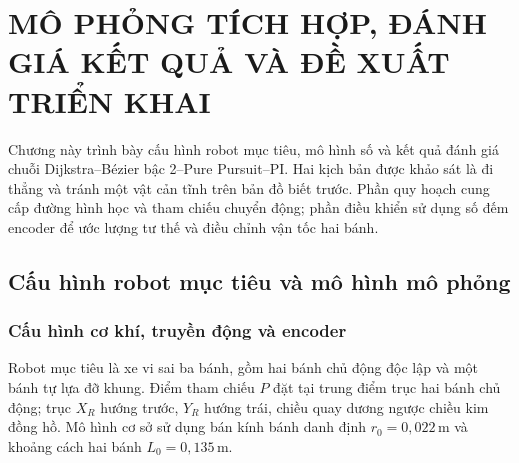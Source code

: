 \documentclass[12pt,a4paper,oneside]{report}
\begin{document}
\setcounter{chapter}{3}

\chapter{MÔ PHỎNG TÍCH HỢP, ĐÁNH GIÁ KẾT QUẢ VÀ ĐỀ XUẤT TRIỂN KHAI}
\label{chap:c4-doclap}

Chương này trình bày cấu hình robot mục tiêu, mô hình số và kết quả đánh giá chuỗi Dijkstra--Bézier bậc 2--Pure Pursuit--PI. Hai kịch bản được khảo sát là đi thẳng và tránh một vật cản tĩnh trên bản đồ biết trước. Phần quy hoạch cung cấp đường hình học và tham chiếu chuyển động; phần điều khiển sử dụng số đếm encoder để ước lượng tư thế và điều chỉnh vận tốc hai bánh.

\section{Cấu hình robot mục tiêu và mô hình mô phỏng}

\subsection{Cấu hình cơ khí, truyền động và encoder}

Robot mục tiêu là xe vi sai ba bánh, gồm hai bánh chủ động độc lập và một bánh tự lựa đỡ khung. Điểm tham chiếu \(P\) đặt tại trung điểm trục hai bánh chủ động; trục \(X_R\) hướng trước, \(Y_R\) hướng trái, chiều quay dương ngược chiều kim đồng hồ. Mô hình cơ sở sử dụng bán kính bánh danh định \(r_0=0{,}022\,\mathrm{m}\) và khoảng cách hai bánh \(L_0=0{,}135\,\mathrm{m}\).
\end{document}
